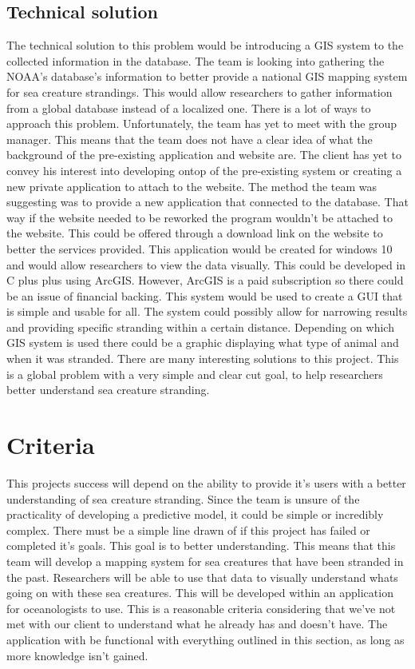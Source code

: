 \documentclass[onecolumn, draftclsnofoot,10pt, compsoc]{IEEEtran}
\begin{document}
      \subsection{Technical solution}
      The technical solution to this problem would be introducing a GIS system to the collected information in the database. The team is looking into gathering the NOAA's database's information to better provide a national GIS mapping system for sea creature strandings. This would allow researchers to gather information from a global database instead of a localized one. There is a lot of ways to approach this problem. Unfortunately, the team has yet to meet with the group manager. This means that the team does not have a clear idea of what the background of the pre-existing application and website are. The client has yet to convey his interest into developing ontop of the pre-existing system or creating a new private application to attach to the website. The method the team was suggesting was to provide a new application that connected to the database. That way if the website needed to be reworked the program wouldn't be attached to the website. This could be offered through a download link on the website to better the services provided. This application would be created for windows 10 and would allow researchers to view the data visually. This could be developed in C plus plus using ArcGIS. However, ArcGIS is a paid subscription so there could be an issue of financial backing. This system would be used to create a GUI that is simple and usable for all. The system could possibly allow for narrowing results and providing specific stranding within a certain distance. Depending on which GIS system is used there could be a graphic displaying what type of animal and when it was stranded. There are many interesting solutions to this project. This is a global problem with a very simple and clear cut goal, to help researchers better understand sea creature stranding.
        
      \section{Criteria}
        This projects success will depend on the ability to provide it's users with a better understanding of sea creature stranding. Since the team is unsure of the practicality of developing a predictive model, it could be simple or incredibly complex. There must be a simple line drawn of if this project has failed or completed it's goals. This goal is to better understanding. This means that this team will develop a mapping system for sea creatures that have been stranded in the past. Researchers will be able to use that data to visually understand whats going on with these sea creatures. This will be developed within an application for oceanologists to use. This is a reasonable criteria considering that we've not met with our client to understand what he already has and doesn't have. The application with be functional with everything outlined in this section, as long as more knowledge isn't gained.
       
\end{document}
